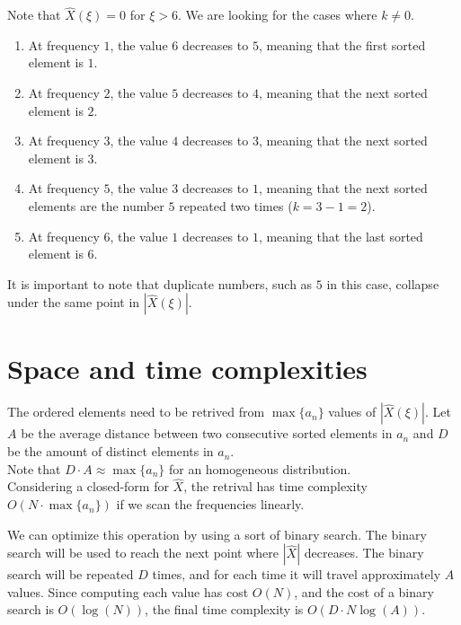 \documentclass{article}
\begin{document}
Note that \(\hat{X}(\xi) = 0\) for \(\xi > 6\).
We are looking for the cases where \(k \neq 0\). \\
\begin{enumerate}
    \item At frequency \(1\), the value \(6\) decreases to \(5\), meaning that the first sorted element is \(1\).
    \item At frequency \(2\), the value \(5\) decreases to \(4\), meaning that the next sorted element is \(2\).
    \item At frequency \(3\), the value \(4\) decreases to \(3\), meaning that the next sorted element is \(3\).
    \item At frequency \(5\), the value \(3\) decreases to \(1\), meaning that the next sorted elements are the number \(5\)
    repeated two times (\(k=3-1=2\)).
    \item At frequency \(6\), the value \(1\) decreases to \(1\), meaning that the last sorted element is \(6\).
\end{enumerate}

It is important to note that duplicate numbers,
such as \(5\) in this case, collapse under the same
point in \(|\hat{X}(\xi)|\).

\section{Space and time complexities}

The ordered elements need to be retrived from \(\max\{a_n\}\) values of
\(|\hat{X}(\xi)|\). Let \(A\) be the average distance between two consecutive sorted
elements in \(a_n\) and \(D\) be the amount of distinct elements in \(a_n\).\\
Note that \(D \cdot A \approx \max\{a_n\}\) for an homogeneous distribution.
\\
Considering a closed-form for \(\hat{X}\), the retrival has time complexity
\(O(N \cdot \max\{a_n\})\) if we scan the frequencies linearly.

We can optimize this operation by using a sort of binary search.
The binary search will be used to reach the next point where \(|\hat{X}|\) decreases.
The binary search will be repeated \(D\) times, and for each time
it will travel approximately \(A\) values. Since computing each value has cost \(O(N)\),
and the cost of a binary search is \(O(\log(N))\),
the final time complexity is \(O(D \cdot N \log(A))\).


\nocite{*} %

\printbibliography
\end{document}
